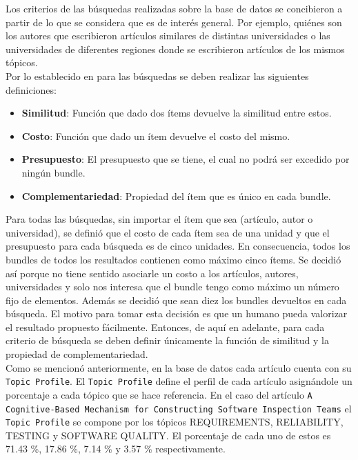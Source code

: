 Los criterios de las búsquedas realizadas sobre la base de datos se concibieron a partir de lo que se considera que es de interés general. Por ejemplo, quiénes son los autores que escribieron artículos similares de distintas universidades o las universidades de diferentes regiones donde se escribieron artículos de los mismos tópicos.\\
Por lo establecido en \cite{compositeRetrival} para las búsquedas se deben realizar las siguientes definiciones:
\begin{itemize}
  \item \textbf{Similitud}: Función que dado dos ítems devuelve la similitud entre estos.
  \item \textbf{Costo}: Función que dado un ítem devuelve el costo del mismo.
  \item \textbf{Presupuesto}: El presupuesto que se tiene, el cual no podrá ser excedido por ningún bundle.
  \item \textbf{Complementariedad}: Propiedad del ítem que es único en cada bundle.
\end{itemize}

Para todas las búsquedas, sin importar el ítem que sea (artículo, autor o universidad), se definió que el costo de cada ítem sea de una unidad y que el presupuesto para cada búsqueda es de cinco unidades. En consecuencia, todos los bundles de todos los resultados contienen como máximo cinco ítems. Se decidió así porque no tiene sentido asociarle un costo a los artículos, autores, universidades y solo nos interesa que el bundle tengo como máximo un número fijo de elementos. Además se decidió que sean diez los bundles devueltos en cada búsqueda. El motivo para tomar esta decisión es que un humano pueda valorizar el resultado propuesto fácilmente. Entonces, de aquí en adelante, para cada criterio de búsqueda se deben definir únicamente la función de similitud y la propiedad de complementariedad.\\

Como se mencionó anteriormente, en la base de datos cada artículo cuenta con su \texttt{Topic Profile}. El \texttt{Topic Profile} define el perfil de cada artículo asignándole un porcentaje a cada tópico que se hace referencia. En el caso del artículo \texttt{A Cognitive-Based Mechanism for Constructing Software Inspection Teams} el \texttt{Topic Profile} se compone por los tópicos  REQUIREMENTS, RELIABILITY, TESTING y SOFTWARE QUALITY. El porcentaje de cada uno de estos es 71.43 \%, 17.86 \%, 7.14 \% y 3.57 \% respectivamente.\\

